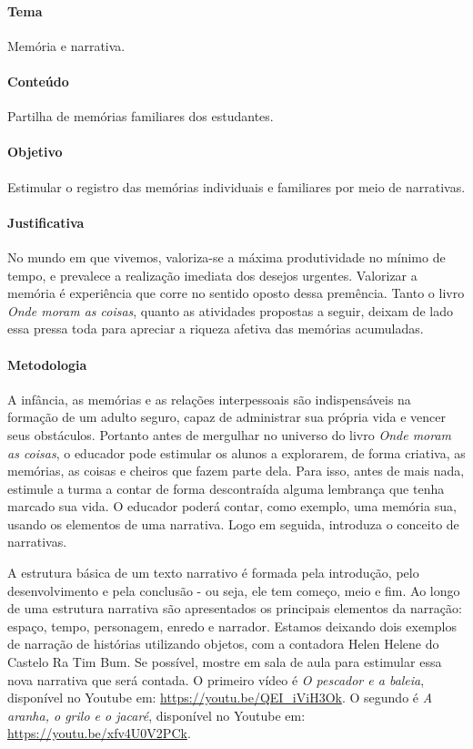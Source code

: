 \documentclass[11pt]{extarticle}
\begin{document}
\paragraph{Tema} Memória e narrativa.

\paragraph{Conteúdo} Partilha de memórias familiares dos estudantes.  

\paragraph{Objetivo} Estimular o registro das memórias individuais e familiares por meio de narrativas. 

\paragraph{Justificativa} No mundo em que vivemos, valoriza-se a máxima produtividade no mínimo de tempo, e prevalece a realização imediata dos desejos urgentes. Valorizar a memória é experiência que corre no sentido oposto dessa premência. Tanto o livro \textit{Onde moram as coisas}, quanto as atividades propostas a seguir, deixam de lado essa pressa toda para apreciar a riqueza afetiva das memórias acumuladas.    

\paragraph{Metodologia} A infância, as memórias e as relações interpessoais são indispensáveis na formação de um adulto seguro, capaz de administrar sua própria vida e vencer seus obstáculos. Portanto antes de mergulhar no universo do livro \textit{Onde moram as coisas}, o educador pode estimular os alunos a explorarem, de forma criativa, as memórias, as coisas e cheiros que fazem parte dela. Para isso, antes de mais nada, estimule a turma a contar de forma descontraída alguma lembrança que tenha marcado sua vida. O educador poderá contar, como exemplo, uma memória sua, usando os elementos de uma narrativa. Logo em seguida, introduza o conceito de narrativas. 

A estrutura básica de um texto narrativo é formada pela introdução, pelo desenvolvimento e pela conclusão - ou seja, ele tem começo, meio e fim. Ao longo de uma estrutura narrativa são apresentados os principais elementos da narração: espaço, tempo, personagem, enredo e narrador. Estamos deixando dois exemplos de narração de histórias utilizando objetos, com a contadora Helen Helene do Castelo Ra Tim Bum. Se possível, mostre em sala de aula para estimular essa nova narrativa que será contada. O primeiro vídeo é \textit{O pescador e a baleia}, disponível no Youtube em: \url{https://youtu.be/QEI_iViH3Ok}. O segundo é \textit{A aranha, o grilo e o jacaré}, disponível no Youtube em: \url{https://youtu.be/xfv4U0V2PCk}. 
\end{document}
